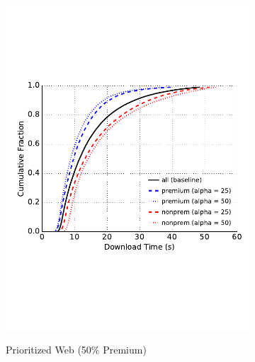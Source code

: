 \begin{figure} \centering
  \begin{subfigure}[t]{0.32\textwidth} \centering
\includegraphics[trim={0 3cm 0 3cm}, clip, width=1.0\textwidth]{images/modifier_pr50_web.pdf}
		\label{fig:stats_a}
		\caption{Prioritized Web (50\% Premium)}
	\end{subfigure}
	\begin{subfigure}[t]{0.32\textwidth} \centering

\end{subfigure}
\end{figure}
